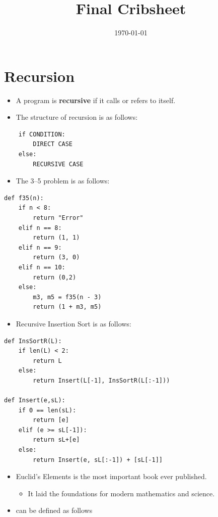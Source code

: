 \documentclass[12pt]{scrartcl}
\title{Final Cribsheet}
\date{\today}
\begin{document}
\maketitle

\section{Recursion}
\begin{itemize}
    \item A program is \textbf{recursive} if it calls or refers to itself.

    \item The structure of recursion is as follows:
\end{itemize}

\begin{lstlisting}
    if CONDITION:
        DIRECT CASE
    else:
        RECURSIVE CASE
\end{lstlisting}

\begin{itemize}
    \item The 3--5 problem is as follows:
\end{itemize}

\begin{lstlisting}
def f35(n):
    if n < 8:
        return "Error"
    elif n == 8:
        return (1, 1)
    elif n == 9:
        return (3, 0)
    elif n == 10:
        return (0,2)
    else:
        m3, m5 = f35(n - 3)
        return (1 + m3, m5)
\end{lstlisting}

\begin{itemize}
    \item Recursive Insertion Sort is as follows:
\end{itemize}

\begin{lstlisting}
def InsSortR(L):
    if len(L) < 2:
        return L
    else:
        return Insert(L[-1], InsSortR(L[:-1]))

def Insert(e,sL):
    if 0 == len(sL):
        return [e]
    elif (e >= sL[-1]):
        return sL+[e]
    else:
        return Insert(e, sL[:-1]) + [sL[-1]]
\end{lstlisting}

\begin{itemize}
    \item Euclid's Elements is the most important book ever published.
        \begin{itemize}
            \item It laid the foundations for modern mathematics and science.
        \end{itemize}

    \item {} can be defined as follows
\end{itemize}
\end{document}
